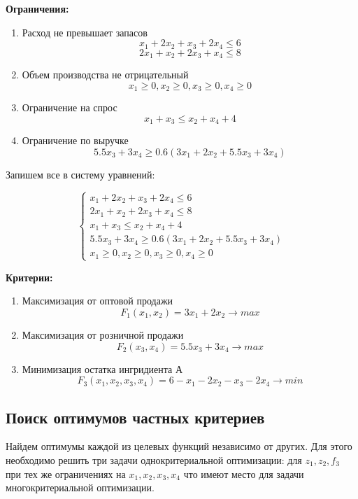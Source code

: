 \documentclass[14pt,a4paper,report]{report}
\begin{document}
\textbf{Ограничения:}
\begin{enumerate}
    \item Расход не превышает запасов $$ x_1 + 2x_2 + x_3 + 2x_4 \leq 6 $$ $$ 2x_1 + x_2 + 2x_3 + x_4 \leq 8 $$
    \item Объем производства не отрицательный $$ x_1 \geq 0 ,  x_2 \geq 0 ,  x_3 \geq 0 ,  x_4 \geq 0  $$
    \item Ограничение на спрос $$x_1+x_3 \leq x_2+x_4+4$$
    \item Ограничение по выручке $$ 5.5x_3 + 3x_4 \geq 0.6 (3x_1 + 2x_2 + 5.5x_3 + 3x_4) $$
\end{enumerate}

Запишем все в систему уравнений:

\begin{equation*}
 \begin{cases}
 x_1 + 2x_2 + x_3 + 2x_4 \leq 6 \\
  2x_1 + x_2 + 2x_3 + x_4 \leq 8 \\
  x_1+x_3 \leq x_2+x_4+4 \\
 5.5x_3 + 3x_4 \geq 0.6 (3x_1 + 2x_2 + 5.5x_3 + 3x_4) \\
  x_1 \geq 0 ,  x_2 \geq 0 ,  x_3 \geq 0 ,  x_4 \geq 0 
 \end{cases}
\end{equation*}



\textbf{Критерии:}
\begin{enumerate}
    \item Максимизация от оптовой продажи $$ F_1(x_1 , x_2) = 3x_1 + 2x_2 \rightarrow max $$
    
    \item Максимизация от розничной продажи $$ F_2(x_3 , x_4) = 5.5x_3 + 3x_4 \rightarrow max $$
    
    \item Минимизация остатка ингридиента А $$ F_3(x_1, x_2, x_3 , x_4) = 6 - x_1 - 2x_2 - x_3 - 2x_4  \rightarrow min $$
\end{enumerate}

\subsection{Поиск оптимумов частных критериев}
Найдем оптимумы каждой из целевых функций независимо от других. Для этого необходимо решить три задачи однокритериальной оптимизации: для $z_1, z_2, f_3$ при тех же ограничениях на $x_{1}, x_{2}, x_{3}, x_{4}$ что имеют место для задачи многокритериальной оптимизации.
\end{document}
